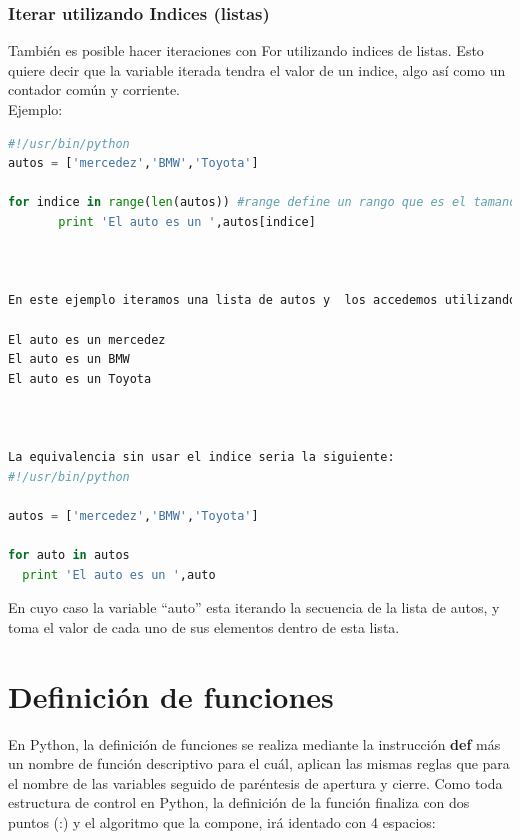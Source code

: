 \documentclass[a4paper, openright, 12pt]{article}
\begin{document}
    \subsubsection{Iterar utilizando Indices (listas)}

    También es posible hacer iteraciones con For utilizando indices de listas. Esto quiere decir que la variable iterada tendra el valor de un indice, algo así como un contador común y corriente.\\

    Ejemplo:\\

    \begin{lstlisting}[language=Python]
#!/usr/bin/python
autos = ['mercedez','BMW','Toyota']

for indice in range(len(autos)) #range define un rango que es el tamano de la lista
       print 'El auto es un ',autos[indice]



En este ejemplo iteramos una lista de autos y  los accedemos utilizando el indice de la lista, el resultado seria:

El auto es un mercedez
El auto es un BMW
El auto es un Toyota



La equivalencia sin usar el indice seria la siguiente:
#!/usr/bin/python

autos = ['mercedez','BMW','Toyota']

for auto in autos
  print 'El auto es un ',auto
    \end{lstlisting}


    En cuyo caso la variable “auto” esta iterando la secuencia de la lista de autos, y toma el valor de cada uno de sus elementos dentro de esta lista.\\

    \newpage{}

  \section{Definición de funciones}
    En Python, la definición de funciones se realiza mediante la instrucción \textbf{def} más un nombre de función descriptivo para el cuál, aplican las mismas reglas que para el nombre de las variables seguido de paréntesis de apertura y cierre. Como toda estructura de control en Python, la definición de la función finaliza con dos puntos (:) y el algoritmo que la compone, irá identado con 4 espacios:\\
\end{document}
